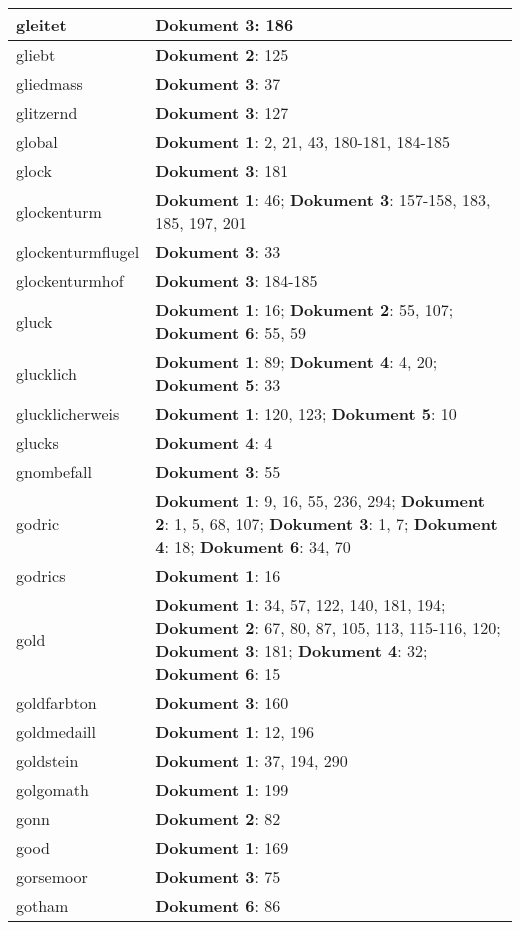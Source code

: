 \documentclass[a5paper]{article}
\begin{document}
\begin{longtable}[l]{|l|p{3in}|}
\hline
gleitet & \textbf{Dokument 3}: 186 \\
\hline
gliebt & \textbf{Dokument 2}: 125 \\
\hline
gliedmass & \textbf{Dokument 3}: 37 \\
\hline
glitzernd & \textbf{Dokument 3}: 127 \\
\hline
global & \textbf{Dokument 1}: 2, 21, 43, 180-181, 184-185 \\
\hline
glock & \textbf{Dokument 3}: 181 \\
\hline
glockenturm & \textbf{Dokument 1}: 46; \textbf{Dokument 3}: 157-158, 183, 185, 197, 201 \\
\hline
glockenturmflugel & \textbf{Dokument 3}: 33 \\
\hline
glockenturmhof & \textbf{Dokument 3}: 184-185 \\
\hline
gluck & \textbf{Dokument 1}: 16; \textbf{Dokument 2}: 55, 107; \textbf{Dokument 6}: 55, 59 \\
\hline
glucklich & \textbf{Dokument 1}: 89; \textbf{Dokument 4}: 4, 20; \textbf{Dokument 5}: 33 \\
\hline
glucklicherweis & \textbf{Dokument 1}: 120, 123; \textbf{Dokument 5}: 10 \\
\hline
glucks & \textbf{Dokument 4}: 4 \\
\hline
gnombefall & \textbf{Dokument 3}: 55 \\
\hline
godric & \textbf{Dokument 1}: 9, 16, 55, 236, 294; \textbf{Dokument 2}: 1, 5, 68, 107; \textbf{Dokument 3}: 1, 7; \textbf{Dokument 4}: 18; \textbf{Dokument 6}: 34, 70 \\
\hline
godrics & \textbf{Dokument 1}: 16 \\
\hline
gold & \textbf{Dokument 1}: 34, 57, 122, 140, 181, 194; \textbf{Dokument 2}: 67, 80, 87, 105, 113, 115-116, 120; \textbf{Dokument 3}: 181; \textbf{Dokument 4}: 32; \textbf{Dokument 6}: 15 \\
\hline
goldfarbton & \textbf{Dokument 3}: 160 \\
\hline
goldmedaill & \textbf{Dokument 1}: 12, 196 \\
\hline
goldstein & \textbf{Dokument 1}: 37, 194, 290 \\
\hline
golgomath & \textbf{Dokument 1}: 199 \\
\hline
gonn & \textbf{Dokument 2}: 82 \\
\hline
good & \textbf{Dokument 1}: 169 \\
\hline
gorsemoor & \textbf{Dokument 3}: 75 \\
\hline
gotham & \textbf{Dokument 6}: 86 \\

\end{longtable}
\end{document}
